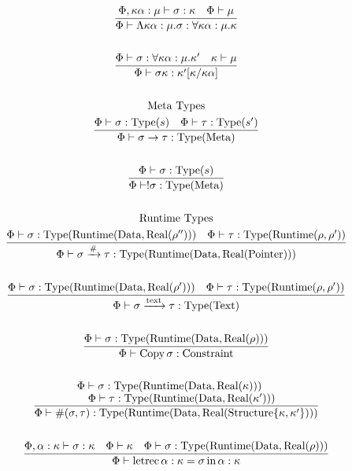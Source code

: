 \documentclass {article}
\begin{document}
\begin{gather*}
\\
\frac
{\Phi, \kappa \alpha : \mu \vdash \sigma : \kappa \quad \Phi \vdash \mu}
{\Phi \vdash \Lambda \kappa \alpha : \mu. \sigma : \forall \kappa \alpha : \mu. \kappa} \\
\\
\frac
{\Phi \vdash \sigma : \forall \kappa \alpha : \mu. \kappa' \quad \kappa \vdash \mu}
{\Phi \vdash \sigma \kappa : \kappa'[\kappa / \kappa \alpha]} \\
\\
\text{Meta Types}
\\
\frac
{\Phi \vdash \sigma : \text{Type} (s) \quad \Phi \vdash \tau : \text{Type} (s')}
{\Phi \vdash \sigma \to \tau : \text{Type} (\text{Meta})} \\
\\
\frac
{\Phi \vdash \sigma : \text{Type} (s)}
{\Phi \vdash !\sigma : \text{Type} (\text{Meta})} \\
\\
\text{Runtime Types}
\\
\frac
{\Phi \vdash \sigma : \text{Type} (\text{Runtime} (\text{Data}, \text{Real} (\rho''))) \quad \Phi \vdash \tau : \text{Type} (\text{Runtime} (\rho, \rho'))}
{\Phi \vdash \sigma \xrightarrow{\#} \tau : \text{Type} (\text{Runtime} (\text{Data}, \text{Real} ( \text{Pointer})))} \\
\\
\frac
{\Phi \vdash \sigma : \text{Type} (\text{Runtime} (\text{Data}, \text{Real}( \rho' ))) \quad \Phi \vdash \tau : \text{Type} (\text{Runtime} (\rho, \rho'))}
{\Phi \vdash \sigma \xrightarrow{\text{text}} \tau : \text{Type} (\text{Text})} \\
\\
\frac
{\Phi \vdash \sigma : \text{Type}(\text{Runtime}(\text{Data}, \text{Real}(\rho)))}
{\Phi \vdash \text{Copy} \, \sigma : \text{Constraint}} \\
\\
\frac
{\splitfrac{\Phi \vdash \sigma : \text{Type}(\text{Runtime}(\text{Data}, \text{Real}(\kappa)))}
{\Phi \vdash \tau : \text{Type} (\text{Runtime}(\text{Data}, \text{Real} (\kappa'))) }}
{\Phi \vdash \#(\sigma, \tau) : \text{Type} (\text{Runtime} (\text{Data}, \text{Real} (\text{Structure} \{ \kappa,\kappa'\} )))} \\
\\
\frac
{\Phi, \alpha : \kappa \vdash \sigma : \kappa \quad \Phi \vdash \kappa \quad \Phi \vdash \sigma : \text{Type}(\text{Runtime}(\text{Data}, \text{Real}(\rho)))  }
{\Phi \vdash \text{letrec} \, \alpha : \kappa = \sigma \, \text{in} \, \alpha : \kappa } \\

\end{gather*}
\end{document}

